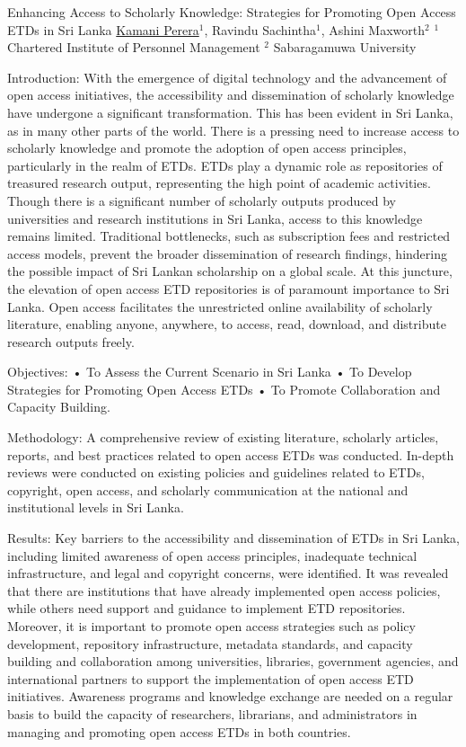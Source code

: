 \begin{abstract_online}{Enhancing Access to Scholarly Knowledge: Strategies for Promoting Open Access ETDs in Sri Lanka}{%
        \underline{Kamani Perera}$^{1}$, Ravindu Sachintha$^{1}$, Ashini Maxworth$^{2}$}{%
        }{
        $^1$ Chartered Institute of Personnel Management\newline{}
        $^2$ Sabaragamuwa University}
        {%
         }

    Introduction: With the emergence of digital technology and the advancement of open access initiatives, the accessibility and dissemination of scholarly knowledge have undergone a significant transformation. This has been evident in Sri Lanka, as in many other parts of the world. There is a pressing need to increase access to scholarly knowledge and promote the adoption of open access principles, particularly in the realm of ETDs. ETDs play a dynamic role as repositories of treasured research output, representing the high point of academic activities. Though there is a significant number of scholarly outputs produced by universities and research institutions in Sri Lanka, access to this knowledge remains limited. Traditional bottlenecks, such as subscription fees and restricted access models, prevent the broader dissemination of research findings, hindering the possible impact of Sri Lankan scholarship on a global scale. At this juncture, the elevation of open access ETD repositories is of paramount importance to Sri Lanka. Open access facilitates the unrestricted online availability of scholarly literature, enabling anyone, anywhere, to access, read, download, and distribute research outputs freely. 

    Objectives: • To Assess the Current Scenario in Sri Lanka • To Develop Strategies for Promoting Open Access ETDs • To Promote Collaboration and Capacity Building.
       
    Methodology: A comprehensive review of existing literature, scholarly articles, reports, and best practices related to open access ETDs was conducted. In-depth reviews were conducted on existing policies and guidelines related to ETDs, copyright, open access, and scholarly communication at the national and institutional levels in Sri Lanka. 

    Results: Key barriers to the accessibility and dissemination of ETDs in Sri Lanka, including limited awareness of open access principles, inadequate technical infrastructure, and legal and copyright concerns, were identified. It was revealed that there are institutions that have already implemented open access policies, while others need support and guidance to implement ETD repositories. Moreover, it is important to promote open access strategies such as policy development, repository infrastructure, metadata standards, and capacity building and collaboration among universities, libraries, government agencies, and international partners to support the implementation of open access ETD initiatives. Awareness programs and knowledge exchange are needed on a regular basis to build the capacity of researchers, librarians, and administrators in managing and promoting open access ETDs in both countries.
      

\end{abstract_online}
